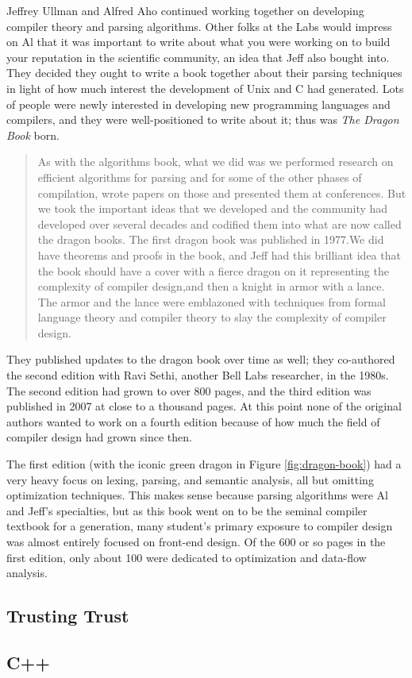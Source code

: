 Jeffrey Ullman and Alfred Aho continued working together on
developing compiler theory and parsing algorithms.
Other folks at the Labs would impress on Al that it was important to write
about what you were working on to build your reputation in the
scientific community, an idea that Jeff also bought into.
They decided they ought to write a book together about their parsing
techniques in light of how much interest the development of Unix and C
had generated. Lots of people were newly interested in developing new
programming languages and compilers, and they were well-positioned to
write about it; thus was \textit{The Dragon Book} born.

\begin{quotation}
	As with the algorithms book, what we did was we performed research
	on efficient algorithms for parsing and for some of the other phases of
	compilation, wrote papers on those and presented them at conferences. But we
	took the important ideas that we developed and the community had developed over
	several decades and codified them into what are now called the dragon books. The
	first dragon book was published in 1977.We did have theorems and proofs in the
	book, and Jeff had this brilliant idea that the book should have a cover with a
	fierce dragon on it representing the complexity of compiler design,and then a
	knight in armor with a lance. The armor and the lance were emblazoned with
	techniques from formal language theory and compiler theory to slay the
	complexity of compiler design.
	\cite{aho_oral_history_2022}
\end{quotation}

They published updates to the dragon book over time as well;
they co-authored the second edition with Ravi Sethi, another Bell Labs researcher,
in the 1980s. The second edition had grown to over 800 pages, and the third edition
was published in 2007 at close to a thousand pages.
At this point none of the original authors wanted to work on a fourth edition
because of how much the field of compiler design had grown since then.

The first edition (with the iconic green dragon in Figure \ref{fig:dragon-book})
had a very heavy focus
on lexing, parsing, and semantic analysis, all but omitting optimization
techniques. This makes sense because parsing algorithms were Al and Jeff's specialties,
but as this book went on to be the seminal compiler textbook for a generation,
many student's primary exposure to compiler design was almost entirely focused on
front-end design.
Of the 600 or so pages in the first edition, only about 100 were dedicated to
optimization and data-flow analysis\cite[Chapters 12, 13, and 14]{the_dragon_book_aho_ullman_1977}.

\subsection{Trusting Trust}
\subsection{C++}
